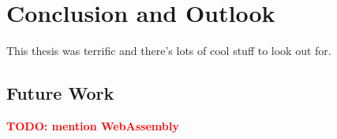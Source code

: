 \documentclass[
    fontsize=12pt,
    headings=small,
    parskip=half,
    bibliography=totoc,
    numbers=noenddot,
    open=any
    ]{scrreprt}
\newcommand{\todo}[1]{\textcolor{red}{\textbf{TODO: #1}}}
\begin{document}

\chapter{Conclusion and Outlook}
\label{chap:conclusion}
This thesis was terrific and there's lots of cool stuff to look out for.

\section{Future Work}
\todo{mention WebAssembly}


\end{document}
